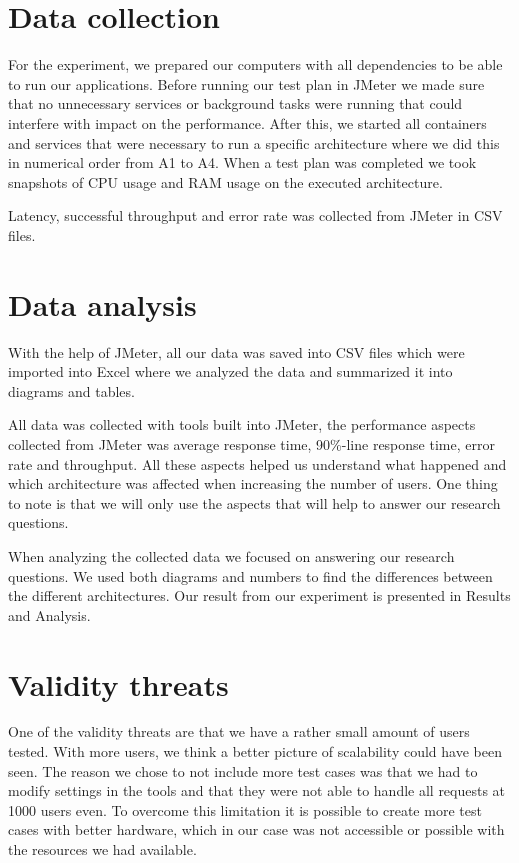 \documentclass[a4paper,oneside]{bth}
\begin{document}
\section{Data collection}
For the experiment, we prepared our computers with all dependencies to be able to run our applications. Before running our test plan in JMeter we made sure that no unnecessary services or background tasks were running that could interfere with impact on the performance. After this, we started all containers and services that were necessary to run a specific architecture where we did this in numerical order from A1 to A4. When a test plan was completed we took snapshots of CPU usage and RAM usage on the executed architecture.

\par\vspace{0.5cm}
Latency, successful throughput and error rate was collected from JMeter in CSV files.
\section{Data analysis}

With the help of JMeter, all our data was saved into CSV files which were imported into Excel where we analyzed the data and summarized it into diagrams and tables.

\par\vspace{0.5cm}
All data was collected with tools built into JMeter, the performance aspects collected from JMeter was average response time, 90\%-line response time, error rate and throughput. All these aspects helped us understand what happened and which architecture was affected when increasing the number of users. One thing to note is that we will only use the aspects that will help to answer our research questions. 

\par\vspace{0.5cm}
When analyzing the collected data we focused on answering our research questions. We used both diagrams and numbers to find the differences between the different architectures. Our result from our experiment is presented in Results and Analysis.

\section{Validity threats}
One of the validity threats \cite{Juristo:2010:BSE:1965114} are that we have a rather small amount of users tested. With more users, we think a better picture of scalability could have been seen. The reason we chose to not include more test cases was that we had to modify settings in the tools and that they were not able to handle all requests at 1000 users even. To overcome this limitation it is possible to create more test cases with better hardware, which in our case was not accessible or possible with the resources we had available. 
\end{document}

